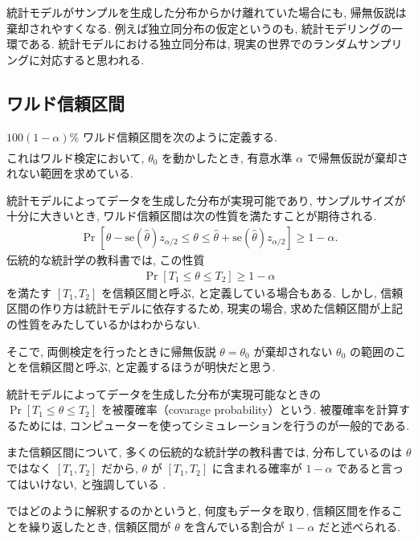 \documentclass[a4paper, 12pt]{jarticle}
\begin{document}
統計モデルがサンプルを生成した分布からかけ離れていた場合にも, 帰無仮説は棄却されやすくなる. 
例えば独立同分布の仮定というのも, 統計モデリングの一環である. 
統計モデルにおける独立同分布は, 現実の世界でのランダムサンプリングに対応すると思われる. 

\subsection{ワルド信頼区間}
$100(1-\alpha)$\% ワルド信頼区間を次のように定義する.
\begin{align}
[\hat \theta - \mathrm{se}(\hat \theta)z_{\alpha/2}, \hat \theta +  \mathrm{se}(\hat \theta)z_{\alpha/2}]
\label{Waldstat}
\end{align}
これはワルド検定において, $\theta_0$ を動かしたとき, 有意水準 $\alpha$ で帰無仮説が棄却されない範囲を求めている. 

統計モデルによってデータを生成した分布が実現可能であり, サンプルサイズが十分に大きいとき, ワルド信頼区間は次の性質を満たすことが期待される. 
\begin{align}
\Pr[\hat \theta - \mathrm{se}(\hat \theta)z_{\alpha/2} \le \theta \le \hat \theta +  \mathrm{se}(\hat \theta)z_{\alpha/2}] \ge 1-\alpha.
\end{align}
伝統的な統計学の教科書では, この性質 
\begin{align}
\Pr[T_1 \le \theta\le T_2] \ge 1-\alpha
\label{CI}
\end{align}
を満たす $[T_1, T_2]$ を信頼区間と呼ぶ, と定義している場合もある. 
しかし, 信頼区間の作り方は統計モデルに依存するため, 現実の場合, 求めた信頼区間が上記の性質をみたしているかはわからない. 

そこで, 両側検定を行ったときに帰無仮説 $\theta = \theta_0$ が棄却されない $\theta_0$ の範囲のことを信頼区間と呼ぶ, と定義するほうが明快だと思う.

統計モデルによってデータを生成した分布が実現可能なときの $\Pr[T_1 \le \theta\le T_2]$ を被覆確率（covarage probability）という.
被覆確率を計算するためには, コンピューターを使ってシミュレーションを行うのが一般的である.
 
また信頼区間について, 多くの伝統的な統計学の教科書では, 分布しているのは $\theta$ ではなく $[T_1, T_2]$ だから, $\theta$ が $[T_1, T_2]$ に含まれる確率が $1-\alpha$ であると言ってはいけない, と強調している . 

ではどのように解釈するのかというと, 何度もデータを取り, 信頼区間を作ることを繰り返したとき, 信頼区間が $\theta$ を含んでいる割合が $1-\alpha$ だと述べられる.
\end{document}
